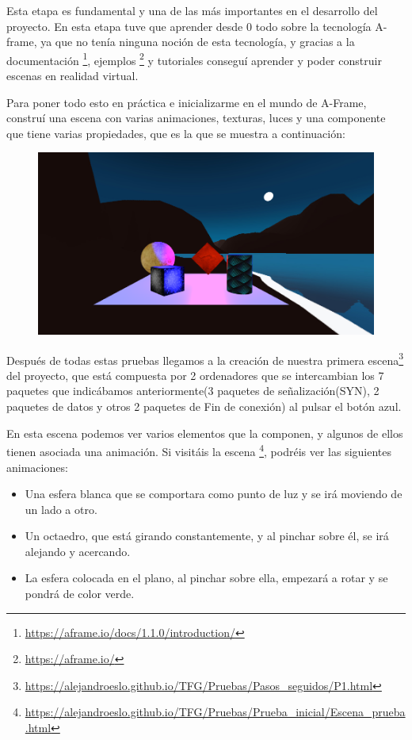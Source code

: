 \documentclass[a4paper, 12pt]{book}
\begin{document}
Esta etapa es fundamental y una de las más importantes en el desarrollo del proyecto.
En esta etapa tuve que aprender desde 0 todo sobre la tecnología A-frame, ya que no tenía ninguna noción de esta tecnología, y gracias a la documentación
\footnote{\url{https://aframe.io/docs/1.1.0/introduction/}}, ejemplos
\footnote{\url{https://aframe.io/}} y tutoriales conseguí aprender y poder construir escenas en realidad virtual.

Para poner todo esto en práctica e inicializarme en el mundo de A-Frame, construí una escena con varias animaciones, texturas, luces y una componente que tiene varias propiedades, que es la que se muestra a continuación:

\begin{figure}[h]
\centering
    \includegraphics[scale=0.45]{img/escena0.png}
\end{figure}
Después de todas estas pruebas llegamos a la creación de nuestra primera escena\footnote{\url{https://alejandroeslo.github.io/TFG/Pruebas/Pasos_seguidos/P1.html}} del proyecto, que está compuesta por 2 ordenadores que se intercambian los 7 paquetes que indicábamos anteriormente(3 paquetes de señalización(SYN), 2 paquetes de datos y otros 2 paquetes de Fin de conexión) al pulsar el botón azul.


En esta escena podemos ver varios elementos que la componen, y algunos de ellos tienen asociada una animación.
Si visitáis la escena
\footnote{\url{https://alejandroeslo.github.io/TFG/Pruebas/Prueba_inicial/Escena_prueba.html}}, podréis ver las siguientes animaciones:

\begin{itemize}

    \item Una esfera blanca que se comportara como punto de luz y se irá moviendo de un lado a otro.
    
    \item Un octaedro, que está girando constantemente, y al pinchar sobre él, se irá alejando y acercando.
    
    \item La esfera colocada en el plano, al pinchar sobre ella, empezará a rotar y se pondrá de color verde.
    
\end{itemize}
\end{document}
